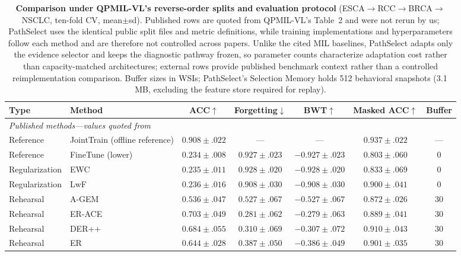 \documentclass{article}
\begin{document}
\begin{table}[t]
\centering\footnotesize
\caption{\textbf{Comparison under QPMIL-VL's reverse-order splits and evaluation protocol} (ESCA$\rightarrow$RCC$\rightarrow$BRCA$\rightarrow$NSCLC, ten-fold CV, mean$\pm$sd). Published rows are quoted from QPMIL-VL's Table~2 \cite{gou2025qpmil} and were not rerun by us; PathSelect uses the identical public split files and metric definitions, while training implementations and hyperparameters follow each method and are therefore not controlled across papers. Unlike the cited MIL baselines, PathSelect adapts only the evidence selector and keeps the diagnostic pathway frozen, so parameter counts characterize adaptation cost rather than capacity-matched architectures; external rows provide published benchmark context rather than a controlled reimplementation comparison. Buffer sizes in WSIs; PathSelect's Selection Memory holds 512 behavioral snapshots (3.1\,MB, excluding the feature store required for replay).}
\label{tab:sota}
\begin{tabular}{llccccc}
\toprule
Type & Method & ACC$\uparrow$ & Forgetting$\downarrow$ & BWT$\uparrow$ & Masked ACC$\uparrow$ & Buffer \\
\midrule
\multicolumn{7}{l}{\emph{Published methods---values quoted from \cite{gou2025qpmil}}} \\
Reference & JointTrain (offline reference) & $0.908{\pm}.022$ & --- & --- & $0.937{\pm}.022$ & --- \\
Reference & FineTune (lower) & $0.234{\pm}.008$ & $0.927{\pm}.023$ & $-0.927{\pm}.023$ & $0.803{\pm}.060$ & 0 \\
Regularization & EWC \cite{kirkpatrick2017ewc} & $0.235{\pm}.011$ & $0.928{\pm}.020$ & $-0.928{\pm}.020$ & $0.833{\pm}.069$ & 0 \\
Regularization & LwF \cite{li2017lwf} & $0.236{\pm}.016$ & $0.908{\pm}.030$ & $-0.908{\pm}.030$ & $0.900{\pm}.041$ & 0 \\
Rehearsal & A-GEM \cite{chaudhry2019agem} & $0.536{\pm}.047$ & $0.527{\pm}.067$ & $-0.527{\pm}.067$ & $0.872{\pm}.026$ & 30 \\
Rehearsal & ER-ACE \cite{caccia2022erace} & $0.703{\pm}.049$ & $0.281{\pm}.062$ & $-0.279{\pm}.063$ & $0.889{\pm}.041$ & 30 \\
Rehearsal & DER++ \cite{buzzega2020derpp} & $0.684{\pm}.055$ & $0.310{\pm}.069$ & $-0.307{\pm}.072$ & $0.910{\pm}.043$ & 30 \\
Rehearsal & ER \cite{chaudhry2019er} & $0.644{\pm}.028$ & $0.387{\pm}.050$ & $-0.386{\pm}.049$ & $0.901{\pm}.035$ & 30 \\

\end{tabular}
\end{table}
\end{document}
